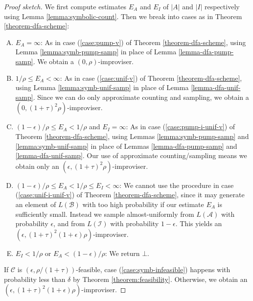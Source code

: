 \documentclass[a4paper,USenglish,numberwithinsect]{lipics}
\theoremstyle{plain}
\theoremstyle{definition}
\newcommand{\improvs}{I}
\newcommand{\valids}{A}
\begin{document}
\begin{proof}[Proof sketch]
We first compute estimates $E_{\valids}$ and $E_{\improvs}$ of $|\valids|$ and $|\improvs|$ respectively using Lemma \ref{lemma:symbolic-count}. Then we break into cases as in Theorem \ref{theorem-dfa-scheme}:
\begin{enumerate}[(A)]
\item $E_{\valids} = \infty$: As in case (\ref{case:pump-v}) of Theorem \ref{theorem-dfa-scheme}, using Lemma \ref{lemma:symb-pump-samp} in place of Lemma \ref{lemma-dfa-pump-samp}. We obtain a $(0, \rho)$-improviser.

\item $1/\rho \le E_{\valids} < \infty$: As in case (\ref{case:unif-v}) of Theorem \ref{theorem-dfa-scheme}, using Lemma \ref{lemma:symb-unif-samp} in place of Lemma \ref{lemma-dfa-unif-samp}. Since we can do only approximate counting and sampling, we obtain a $(0, (1+\tau)^2 \rho)$-improviser.

\item $(1-\epsilon)/\rho \le E_{\valids} < 1/\rho$ and $E_{\improvs} = \infty$: As in case (\ref{case:pump-i-unif-v}) of Theorem \ref{theorem-dfa-scheme}, using Lemmas \ref{lemma:symb-pump-samp} and \ref{lemma:symb-unif-samp} in place of Lemmas \ref{lemma-dfa-pump-samp} and \ref{lemma-dfa-unif-samp}. Our use of approximate counting/sampling means we obtain only an $(\epsilon, (1+\tau)^2 \rho)$-improviser.

\item $(1-\epsilon)/\rho \le E_{\valids} < 1/\rho \le E_{\improvs} < \infty$: We cannot use the procedure in case (\ref{case:unif-i-unif-v}) of Theorem \ref{theorem-dfa-scheme}, since it may generate an element of $L(\mathcal{B})$ with too high probability if our estimate $E_{\valids}$ is sufficiently small. Instead we sample almost-uniformly from $L(\mathcal{\valids})$ with probability $\epsilon$, and from $L(\mathcal{\improvs})$ with probability $1-\epsilon$. This yields an $(\epsilon, (1+\tau)^2 (1+\epsilon) \rho)$-improviser.

\item \label{case:symb-infeasible} $E_{\improvs} < 1/\rho$ or $E_{\valids} < (1-\epsilon) / \rho$: We return $\bot$.
\end{enumerate}

If $\mathcal{C}$ is $(\epsilon, \rho/(1+\tau))$-feasible, case (\ref{case:symb-infeasible}) happens with probability less than $\delta$ by Theorem \ref{theorem:feasibility}. Otherwise, we obtain an $(\epsilon, (1+\tau)^2 (1+\epsilon) \rho)$-improviser.
\end{proof}
\end{document}
